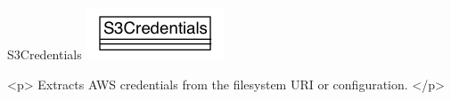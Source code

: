 \begin{XeClass}{S3Credentials}
\includegraphics[width=\textwidth]{cdig/S3Credentials.png}
     
 <p>
 Extracts AWS credentials from the filesystem URI or configuration.
 </p>

\end{XeClass}

